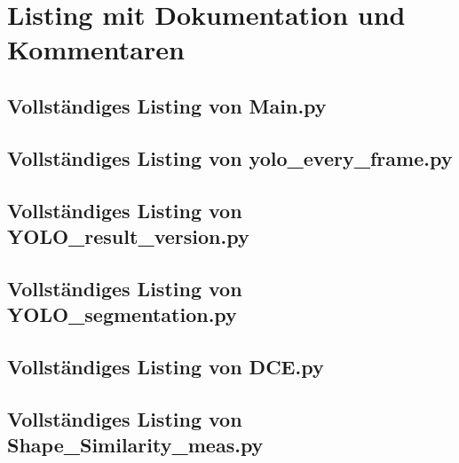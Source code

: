 \section{Listing mit Dokumentation und Kommentaren}{\label{cd:gesamt_listing}}




\subsection{Vollständiges Listing von Main.py}{
    }

\subsection{Vollständiges Listing von yolo\_every\_frame.py}{
    }

\subsection{Vollständiges Listing von YOLO\_result\_version.py}{
    }

\subsection{Vollständiges Listing von YOLO\_segmentation.py}{
    }

\subsection{Vollständiges Listing von DCE.py}{
    }

\subsection{ Vollständiges Listing von Shape\_Similarity\_meas.py}{
    
}


